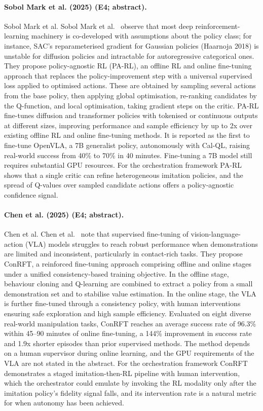 \documentclass[10pt,a4paper]{article}
\begin{document}
\paragraph{Sobol Mark et al. (2025) (E4; abstract).} Sobol Mark et al. Sobol Mark et al.~\cite{Mark2025} observe that most deep reinforcement-learning machinery is co-developed with assumptions about the policy class; for instance, SAC's reparameterised gradient for Gaussian policies (Haarnoja 2018) is unstable for diffusion policies and intractable for autoregressive categorical ones. They propose policy-agnostic RL (PA-RL), an offline RL and online fine-tuning approach that replaces the policy-improvement step with a universal supervised loss applied to optimised actions. These are obtained by sampling several actions from the base policy, then applying global optimisation, re-ranking candidates by the Q-function, and local optimisation, taking gradient steps on the critic. PA-RL fine-tunes diffusion and transformer policies with tokenised or continuous outputs at different sizes, improving performance and sample efficiency by up to 2x over existing offline RL and online fine-tuning methods. It is reported as the first to fine-tune OpenVLA, a 7B generalist policy, autonomously with Cal-QL, raising real-world success from 40\% to 70\% in 40 minutes. Fine-tuning a 7B model still requires substantial GPU resources. For the orchestration framework PA-RL shows that a single critic can refine heterogeneous imitation policies, and the spread of Q-values over sampled candidate actions offers a policy-agnostic confidence signal.

\paragraph{Chen et al. (2025) (E4; abstract).} Chen et al. Chen et al.~\cite{Chen2025} note that supervised fine-tuning of vision-language-action (VLA) models struggles to reach robust performance when demonstrations are limited and inconsistent, particularly in contact-rich tasks. They propose ConRFT, a reinforced fine-tuning approach comprising offline and online stages under a unified consistency-based training objective. In the offline stage, behaviour cloning and Q-learning are combined to extract a policy from a small demonstration set and to stabilise value estimation. In the online stage, the VLA is further fine-tuned through a consistency policy, with human interventions ensuring safe exploration and high sample efficiency. Evaluated on eight diverse real-world manipulation tasks, ConRFT reaches an average success rate of 96.3\% within 45--90 minutes of online fine-tuning, a 144\% improvement in success rate and 1.9x shorter episodes than prior supervised methods. The method depends on a human supervisor during online learning, and the GPU requirements of the VLA are not stated in the abstract. For the orchestration framework ConRFT demonstrates a staged imitation-then-RL pipeline with human intervention, which the orchestrator could emulate by invoking the RL modality only after the imitation policy's fidelity signal falls, and its intervention rate is a natural metric for when autonomy has been achieved.
\end{document}
